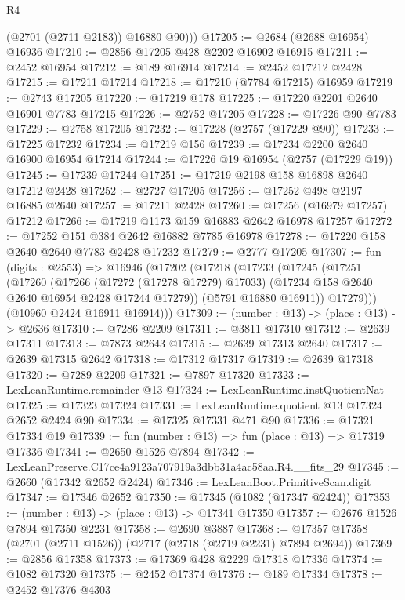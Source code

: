 \begin{lexlean}{R4}
\begin{coremodule}
          (@2701 (@2711 @2183))
          @16880
          @90)))
@17205 := @2684 (@2688 @16954) @16936
@17210 := @2856 @17205 @428 @2202 @16902 @16915
@17211 := @2452 @16954
@17212 := @189 @16914
@17214 := @2452 @17212 @2428
@17215 := @17211 @17214
@17218 := @17210 (@7784 @17215) @16959
@17219 := @2743 @17205
@17220 := @17219 @178
@17225 := @17220 @2201 @2640 @16901 @7783 @17215
@17226 := @2752 @17205
@17228 := @17226 @90 @7783
@17229 := @2758 @17205
@17232 := @17228 (@2757 (@17229 @90))
@17233 := @17225 @17232
@17234 := @17219 @156
@17239 := @17234 @2200 @2640 @16900 @16954 @17214
@17244 := @17226 @19 @16954 (@2757 (@17229 @19))
@17245 := @17239 @17244
@17251 := @17219 @2198 @158 @16898 @2640 @17212 @2428
@17252 := @2727 @17205
@17256 := @17252 @498 @2197 @16885 @2640
@17257 := @17211 @2428
@17260 := @17256 (@16979 @17257) @17212
@17266 := @17219 @1173 @159 @16883 @2642 @16978 @17257
@17272 := @17252 @151 @384 @2642 @16882 @7785 @16978
@17278 := @17220 @158 @2640 @2640 @7783 @2428 @17232
@17279 := @2777 @17205
@17307 := fun (digits : @2553) =>
  @16946
    (@17202
      (@17218
        (@17233
          (@17245
            (@17251
              (@17260
                (@17266
                  (@17272 (@17278 @17279) @17033)
                  (@17234 @158 @2640 @2640 @16954 @2428 @17244 @17279))
                (@5791 @16880 @16911))
              @17279)))
        (@10960 @2424 @16911 @16914)))
@17309 := (number : @13) -> (place : @13) -> @2636
@17310 := @7286 @2209
@17311 := @3811 @17310
@17312 := @2639 @17311
@17313 := @7873 @2643
@17315 := @2639 @17313 @2640
@17317 := @2639 @17315 @2642
@17318 := @17312 @17317
@17319 := @2639 @17318
@17320 := @7289 @2209
@17321 := @7897 @17320
@17323 := LexLeanRuntime.remainder @13
@17324 := LexLeanRuntime.instQuotientNat
@17325 := @17323 @17324
@17331 := LexLeanRuntime.quotient @13 @17324 @2652 @2424 @90
@17334 := @17325 @17331 @471 @90
@17336 := @17321 @17334 @19
@17339 := fun (number : @13) => fun (place : @13) => @17319 @17336
@17341 := @2650 @1526 @7894
@17342 := LexLeanPreserve.C17ce4a9123a707919a3dbb31a4ac58aa.R4.__fits_29
@17345 := @2660 (@17342 @2652 @2424)
@17346 := LexLeanBoot.PrimitiveScan.digit
@17347 := @17346 @2652
@17350 := @17345 (@1082 (@17347 @2424))
@17353 := (number : @13) -> (place : @13) -> @17341 @17350
@17357 := @2676 @1526 @7894 @17350 @2231
@17358 := @2690 @3887
@17368 := @17357 @17358 (@2701 (@2711 @1526)) (@2717 (@2718 (@2719 @2231) @7894 @2694))
@17369 := @2856 @17358
@17373 := @17369 @428 @2229 @17318 @17336
@17374 := @1082 @17320
@17375 := @2452 @17374
@17376 := @189 @17334
@17378 := @2452 @17376 @4303

\end{coremodule}
\end{lexlean}
